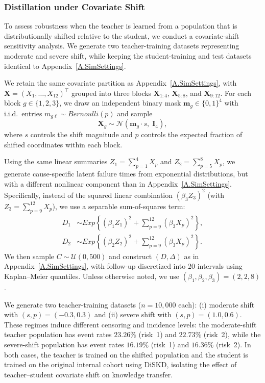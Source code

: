 \documentclass{article}
\theoremstyle{plain}
\theoremstyle{definition}
\theoremstyle{remark}
\begin{document}
\subsubsection{Distillation under Covariate Shift}
\label{A.Sim.Hetero}
To assess robustness when the teacher is learned from a population that is distributionally shifted relative to the student, we conduct a covariate-shift sensitivity analysis.
We generate two teacher-training datasets representing moderate and severe shift, while keeping the student-training and test datasets identical to Appendix~\ref{A.SimSettings}.


We retain the same covariate partition as Appendix~\ref{A.SimSettings}, with $\bm{X}=(X_1,\ldots,X_{12})^\top$ grouped into three blocks $\bm{X}_{1:4}$, $\bm{X}_{5:8}$, and $\bm{X}_{9:12}$.
For each block $g\in\{1,2,3\}$, we draw an independent binary mask $\bm{m}_g\in\{0,1\}^4$ with i.i.d.\ entries $m_{g\ell}\sim\mathit{Bernoulli}(p)$ and sample
\[
\bm{X}_{g} \sim \mathcal{N}\!\left(\bm{m}_g \cdot s,\; \bm{I}_4\right),
\]
where $s$ controls the shift magnitude and $p$ controls the expected fraction of shifted coordinates within each block.

Using the same linear summaries $Z_1=\sum_{p=1}^4 X_p$ and $Z_2=\sum_{p=5}^8 X_p$, we generate cause-specific latent failure times from exponential distributions, but with a different nonlinear component than in Appendix~\ref{A.SimSettings}.
Specifically, instead of the squared linear combination $(\beta_3 Z_3)^2$ (with $Z_3=\sum_{p=9}^{12}X_p$), we use a separable sum-of-squares term:
\begin{align*}
D_1 &\sim \mathit{Exp}\!\left\{(\beta_1 Z_1)^2 + \sum_{p=9}^{12} (\beta_3 X_p)^2 \right\},\\
D_2 &\sim \mathit{Exp}\!\left\{(\beta_2 Z_2)^2 + \sum_{p=9}^{12} (\beta_3 X_p)^2 \right\}.
\end{align*}
We then sample $C\sim\mathcal{U}(0, 500)$ and construct $(D,\Delta)$ as in Appendix~\ref{A.SimSettings}, with follow-up discretized into 20 intervals using Kaplan--Meier quantiles.
Unless otherwise noted, we use $(\beta_1,\beta_2,\beta_3)=(2,2,8)$.

We generate two teacher-training datasets ($n=10{,}000$ each): (i) moderate shift with $(s,p)=(-0.3,0.3)$ and (ii) severe shift with $(s,p)=(1.0,0.6)$.
These regimes induce different censoring and incidence levels: the moderate-shift teacher population has event rates $23.26\%$ (risk~1) and $22.73\%$ (risk~2), while the severe-shift population has event rates $16.19\%$ (risk~1) and $16.36\%$ (risk~2).
In both cases, the teacher is trained on the shifted population and the student is trained on the original internal cohort using DiSKD, isolating the effect of teacher--student covariate shift on knowledge transfer.
\end{document}
